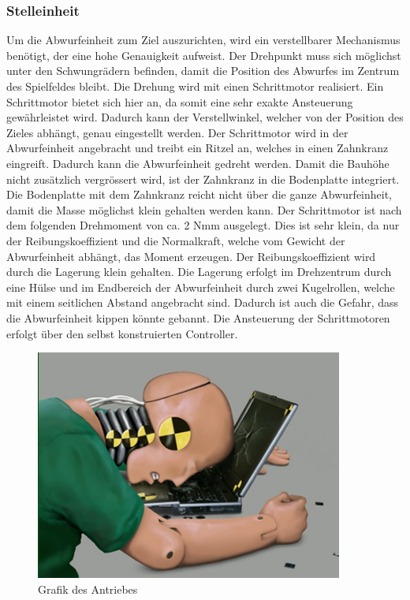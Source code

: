 \subsubsection{Stelleinheit}
Um die Abwurfeinheit zum Ziel auszurichten, wird ein verstellbarer Mechanismus benötigt, der eine hohe Genauigkeit aufweist. Der Drehpunkt muss sich möglichst unter den Schwungrädern befinden, damit die Position des Abwurfes im Zentrum des Spielfeldes bleibt. Die Drehung wird mit einen Schrittmotor realisiert. Ein Schrittmotor bietet sich hier an, da somit eine sehr exakte Ansteuerung gewährleistet wird. Dadurch kann der Verstellwinkel, welcher von der Position des Zieles abhängt, genau eingestellt werden. Der Schrittmotor wird in der Abwurfeinheit angebracht und treibt ein Ritzel an, welches in einen Zahnkranz eingreift. Dadurch kann die Abwurfeinheit gedreht werden. Damit die Bauhöhe nicht zusätzlich vergrössert wird, ist der Zahnkranz in die Bodenplatte integriert. Die Bodenplatte mit dem Zahnkranz reicht nicht über die ganze Abwurfeinheit, damit die Masse möglichst klein gehalten werden kann. Der Schrittmotor ist nach dem folgenden Drehmoment von ca. 2 Nmm ausgelegt. Dies ist sehr klein, da nur der Reibungskoeffizient und die Normalkraft, welche vom Gewicht der Abwurfeinheit abhängt, das Moment erzeugen. Der Reibungskoeffizient wird durch die Lagerung klein gehalten. Die Lagerung erfolgt im Drehzentrum durch eine Hülse und im Endbereich der Abwurfeinheit durch zwei Kugelrollen, welche mit einem seitlichen Abstand angebracht sind. Dadurch ist auch die Gefahr, dass die Abwurfeinheit kippen könnte gebannt. Die Ansteuerung der Schrittmotoren erfolgt über den selbst konstruierten Controller.

\begin{figure}
	\centering
	\includegraphics[width=0.9\textwidth]{Enddokumentation/CrashTestDummy.jpg}
	\caption{Grafik des Antriebes}
	\label{fig:Grafik des Antriebes}	
\end{figure}